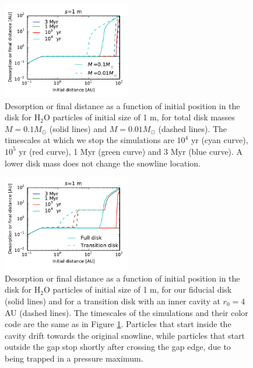\documentclass[apj]{emulateapj}
\begin{document}
\begin{figure}[h!]
\centering
\includegraphics[width=0.5\textwidth]{desorption_distance_varying_Md.pdf}
\caption{Desorption or final distance as a function of initial position in the disk for H$_2$O particles of initial size of 1 m, for total disk masses $M=0.1 M_{\odot}$ (solid lines) and $M=0.01 M_{\odot}$ (dashed lines). The timescales at which we stop the simulations are $10^4$ yr (cyan curve), $10^5$ yr (red curve), 1 Myr (green curve) and 3 Myr (blue curve). A lower disk mass does not change the snowline location.}
\label{fig:varMd}
\end{figure}

\begin{figure}[h!]
\centering
\includegraphics[width=0.5\textwidth]{desorption_distance_transition_disk_1000.pdf}
\caption{Desorption or final distance as a function of initial position in the disk for H$_2$O particles of initial size of 1 m, for our fiducial disk (solid lines) and for a transition disk with an inner cavity at $r_0=4$ AU (dashed lines). The timescales of the simulations and their color code are the same as in Figure \ref{fig:varMd}. Particles that start inside the cavity drift towards the original snowline, while particles that start outside the gap stop shortly after crossing the gap edge, due to being trapped in a pressure maximum.}
\label{fig:cavity}
\end{figure}
\end{document}
